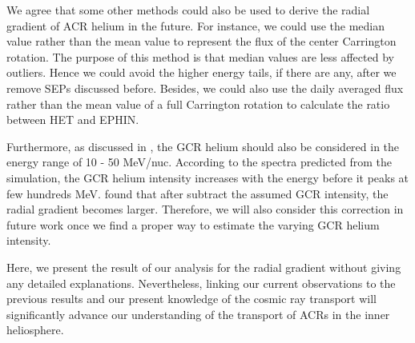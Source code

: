 We agree that some other methods could also be used to derive the radial gradient of \ac{ACR} helium in the future. For instance, we could use the median value rather than the mean value to represent the flux of the center Carrington rotation. The purpose of this method is that median values are less affected by outliers. Hence we could avoid the higher energy tails, if there are any, after we remove \acp{SEP} discussed before. Besides, we could also use the daily averaged flux rather than the mean value of a full Carrington rotation to calculate the ratio between \ac{HET} and \ac{EPHIN}. 


Furthermore, as discussed in \citet{Rankin2021ApJ}, the \ac{GCR} helium should also be considered in the energy range of 10 - 50 MeV/nuc. According to the spectra predicted from the simulation, the \ac{GCR} helium intensity increases with the energy before it peaks at few hundreds MeV. \citet{Rankin2021ApJ} found that after subtract the assumed \ac{GCR} intensity, the radial gradient becomes larger. Therefore, we will also consider this correction in future work once we find a proper way to estimate the varying \ac{GCR} helium intensity.

Here, we present the result of our analysis for the radial gradient without giving any detailed explanations. Nevertheless, linking our current observations to the previous results and our present knowledge of the cosmic ray transport will significantly advance our understanding of the transport of \acp{ACR} in the inner heliosphere.




